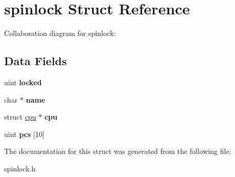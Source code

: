 \hypertarget{structspinlock}{}\section{spinlock Struct Reference}
\label{structspinlock}


Collaboration diagram for spinlock\+:
\subsection*{Data Fields}
\begin{DoxyCompactItemize}
\item 
\mbox{\label{structspinlock_a48f3007579f644934d9aba91e5378c03}} 
uint {\bfseries locked}
\item 
\mbox{\label{structspinlock_afbec3274bf8ad9c421695a22f8d9d584}} 
char $\ast$ {\bfseries name}
\item 
\mbox{\label{structspinlock_a290ae772c8ccb9e8c1580204c31a7f88}} 
struct \mbox{\hyperlink{structcpu}{cpu}} $\ast$ {\bfseries cpu}
\item 
\mbox{\label{structspinlock_ac9ef3f16f664094198af0b9063e23fe0}} 
uint {\bfseries pcs} \mbox{[}10\mbox{]}
\end{DoxyCompactItemize}


The documentation for this struct was generated from the following file\+:\begin{DoxyCompactItemize}
\item 
spinlock.\+h\end{DoxyCompactItemize}
